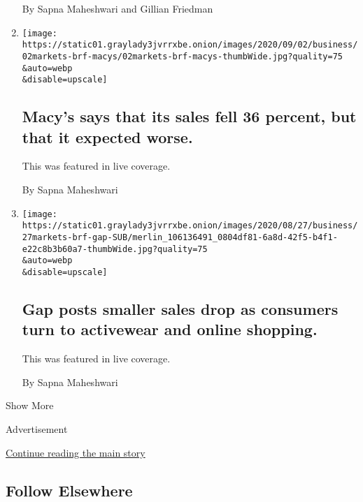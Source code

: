 \begin{enumerate}
  By Sapna Maheshwari and Gillian Friedman
\item
  \href{/live/2020/09/02/business/stock-market-today-coronavirus/macys-says-that-its-sales-fell-36-percent-but-that-it-expected-worse}{}

  \texttt{[image: https://static01.graylady3jvrrxbe.onion/images/2020/09/02/business/02markets-brf-macys/02markets-brf-macys-thumbWide.jpg?quality=75\\\&auto=webp\\\&disable=upscale]}

  \hypertarget{macys-says-that-its-sales-fell-36-percent-but-that-it-expected-worse}{%
  \subsection{Macy's says that its sales fell 36 percent, but that it
  expected
  worse.}\label{macys-says-that-its-sales-fell-36-percent-but-that-it-expected-worse}}

  This was featured in live coverage.

  By Sapna Maheshwari
\item
  \href{/live/2020/08/27/business/stock-market-today-coronavirus/gap-posts-smaller-sales-drop-as-consumers-turn-to-activewear-and-online-shopping}{}

  \texttt{[image: https://static01.graylady3jvrrxbe.onion/images/2020/08/27/business/27markets-brf-gap-SUB/merlin\_106136491\_0804df81-6a8d-42f5-b4f1-e22c8b3b60a7-thumbWide.jpg?quality=75\\\&auto=webp\\\&disable=upscale]}

  \hypertarget{gap-posts-smaller-sales-drop-as-consumers-turn-to-activewear-and-online-shopping}{%
  \subsection{Gap posts smaller sales drop as consumers turn to
  activewear and online
  shopping.}\label{gap-posts-smaller-sales-drop-as-consumers-turn-to-activewear-and-online-shopping}}

  This was featured in live coverage.

  By Sapna Maheshwari
\end{enumerate}

Show More

Advertisement

\protect\hyperlink{after-mid2}{Continue reading the main story}

\hypertarget{follow-elsewhere}{%
\subsection{Follow Elsewhere}\label{follow-elsewhere}}

